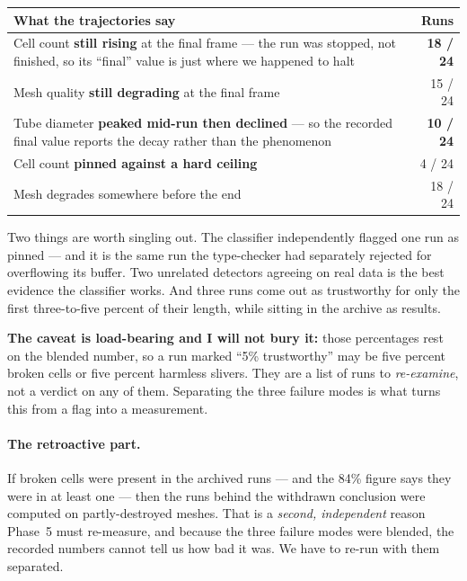 \documentclass[11pt,a4paper]{article}
\begin{document}
\begin{center}\small
\begin{tabular}{@{}p{10.2cm} r@{}}
\toprule
\textbf{What the trajectories say} & \textbf{Runs}\\
\midrule
Cell count \textbf{still rising} at the final frame --- the run was stopped, not finished, so
its ``final'' value is just where we happened to halt & \textbf{18 / 24}\\
Mesh quality \textbf{still degrading} at the final frame & 15 / 24\\
Tube diameter \textbf{peaked mid-run then declined} --- so the recorded final value reports the
decay rather than the phenomenon & \textbf{10 / 24}\\
Cell count \textbf{pinned against a hard ceiling} & 4 / 24\\
Mesh degrades somewhere before the end & 18 / 24\\
\bottomrule
\end{tabular}
\end{center}

Two things are worth singling out. The classifier independently flagged one run as pinned --- and
it is the same run the type-checker had separately rejected for overflowing its buffer. Two
unrelated detectors agreeing on real data is the best evidence the classifier works. And three
runs come out as trustworthy for only the first three-to-five percent of their length, while
sitting in the archive as results.

\textbf{The caveat is load-bearing and I will not bury it:} those percentages rest on the blended
number, so a run marked ``5\% trustworthy'' may be five percent broken cells or five percent
harmless slivers. They are a list of runs to \emph{re-examine}, not a verdict on any of them.
Separating the three failure modes is what turns this from a flag into a measurement.

\paragraph{The retroactive part.} If broken cells were present in the archived runs --- and the
84\% figure says they were in at least one --- then the runs behind the withdrawn conclusion were
computed on partly-destroyed meshes. That is a \emph{second, independent} reason Phase~5 must
re-measure, and because the three failure modes were blended, the recorded numbers cannot tell us
how bad it was. We have to re-run with them separated.
\end{document}
